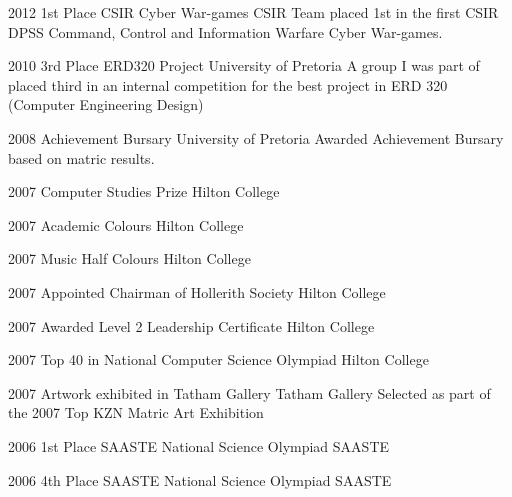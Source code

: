\documentclass[]{friggeri-cv}
\begin{document}
\begin{entrylist}
	\entry
	{2012}
	{1st Place CSIR Cyber War-games}
	{CSIR}
	{Team placed 1st in the first CSIR DPSS Command, Control and Information Warfare Cyber War-games.}
	
	\entry
	{2010}
	{3rd Place ERD320 Project}
	{University of Pretoria}
	{A group I was part of placed third in an internal competition for the best project in ERD 320 	(Computer Engineering Design)}
	
	\entry
	{2008}
	{Achievement Bursary}
	{University of Pretoria}
	{Awarded Achievement Bursary based on matric results.}
	
	\entry
	{2007}
	{Computer Studies Prize}
	{Hilton College}
	{}

	\entry
	{2007}
	{Academic Colours}
	{Hilton College}
	{}
	

	
	\entry
	{2007}
	{Music Half Colours}
	{Hilton College}
	{}
	
	\entry
	{2007}
	{Appointed Chairman of Hollerith Society}
	{Hilton College}
	{}
	
	\entry
	{2007}
	{Awarded Level 2 Leadership Certificate}
	{Hilton College}
	{}
	
		\end{entrylist}
\begin{entrylist}
	
	\entry
	{2007}
	{Top 40 in National Computer Science Olympiad}
	{Hilton College}
	{}
	
	\entry
	{2007}
	{Artwork exhibited in Tatham Gallery}
	{Tatham Gallery}
	{Selected as part of the 2007 Top KZN Matric Art Exhibition}
	
	\entry
	{2006}
	{1st Place SAASTE National Science Olympiad}
	{SAASTE}
	{}
	
	\entry
	{2006}
	{4th Place SAASTE National Science Olympiad}
	{SAASTE}
	{}
\end{entrylist}
\end{document}
